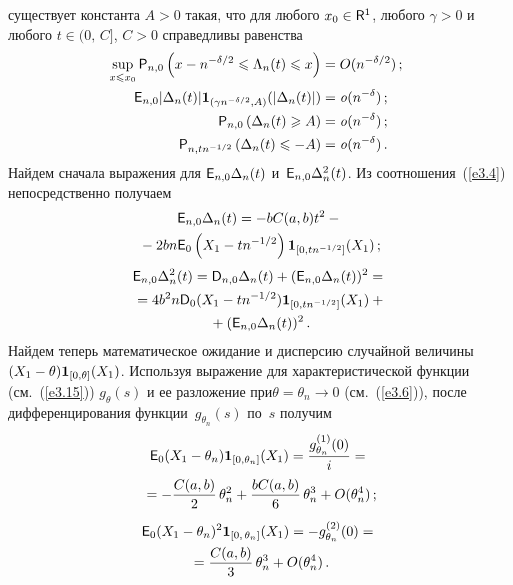 \begin{multicols}{2}
существует константа $A>0$ такая, что для любого
$x_0\in {\sf R}^1$, любого $\gamma > 0$ и любого $t \in (0,\,C]$,
$C > 0$ справедливы равенства
\begin{align}
\!\!\!\sup_{x\le x_0} {\p}_{n,0}\left(x - n^{-\delta/2} \le \Lambda_n(t)  \le
x\right ) & = O(n^{-\delta/2})\,;\notag\\
\!\!\!\!\!\!{\e}_{n,0}|\Delta_n(t)| {\IT_{(\gamma n^{-\delta/2},A)}(|\Delta_n(t)|)}& = {\it o}(n^{-\delta})\,;\label{e3.12}\\
\!\!\!\!\!\!{\p}_{n,0}\left(\Delta_n(t) \ge  A\right) &= {\it  o}(n^{-\delta})\,;
\label{e3.13}\\
\!\!\!\!\!\!{\p}_{n,tn^{-1/2}}\left(\Delta_n(t) \le  -A\right) & = {\it o}(n^{-\delta})\,.\label{e3.14}
\end{align}
Найдем сначала выражения для ${{\sf E}}_{n,0}\Delta_n(t)$ 
и~${{\sf E}}_{n,0}\Delta_n^2(t)$. Из соотношения~(\ref{e3.4}) непосредственно получаем
\begin{multline}
{{\sf E}}_{n,0} \Delta_n(t)  =  - bC(a,b) t^2 -{}\\
{}- 2b
n {{\sf E}}_0 \left(X_1 - tn^{-1/2}\right){{\bf 1}_{[0,tn^{-1/2}]}(X_1)}\,;
\label{e3.15}
\end{multline}
\begin{multline}
{{\sf E}}_{n,0} \Delta_n^2(t) =  {{\sf D}}_{n,0}\Delta_n(t) +
({{\sf E}}_{n,0}\Delta_n(t))^2={}\\
{}
=4 {b}^2 n{{\sf D}}_0 (X_1 - tn^{-1/2}){{\bf 1}_{[0,tn^{-1/2}]}(X_1)}+{}\\
{}+
({{\sf E}}_{n,0} \Delta_n(t))^2\,. \label{e3.16}
\end{multline}
Найдем теперь  математическое ожидание и дис\-персию случайной
величины $(X_1-\theta){{\bf 1}_{[0,\theta]}(X_1)}$. Используя
выражение  для характеристической функции (см.~(\ref{e3.15}))
$g_{\theta}(s)$ и ее разложение  при\linebreak $\theta = \theta_n \to 0$
(см.~(\ref{e3.6})), после дифференцирования функции~$g_{\theta_n}(s)$ по~$s$ получим
\begin{multline}
{{\sf E}}_0 (X_1 - \theta_n){{\bf 1}_{[0,\theta_n]}(X_1)} =
\displaystyle\frac{\displaystyle g_{\theta_n}^{(1)}(0)\mathstrut}{\displaystyle i\mathstrut} ={}\\
{}= - \displaystyle\frac{\displaystyle C(a,b)\mathstrut}{\displaystyle 2\mathstrut}\,\theta_n^2
+ \displaystyle\frac{\displaystyle bC(a,b)\mathstrut}{\displaystyle 6\mathstrut}\,\theta_n^3 +O(\theta_n^4)\,; \label{e3.17}
\end{multline}
\begin{multline}
{{\sf E}}_0 (X_1 - \theta_n)^2{{\bf 1}_{[0,\,\theta_n]}(X_1)} =
- g_{\theta_n}^{(2)}(0) ={}\\
{}=
 \displaystyle\frac{\displaystyle C(a,b)\mathstrut}{\displaystyle 3\mathstrut}\,\theta_n^3+
 O(\theta_n^4)\,. \label{e3.18}
\end{multline}

\end{multicols}
